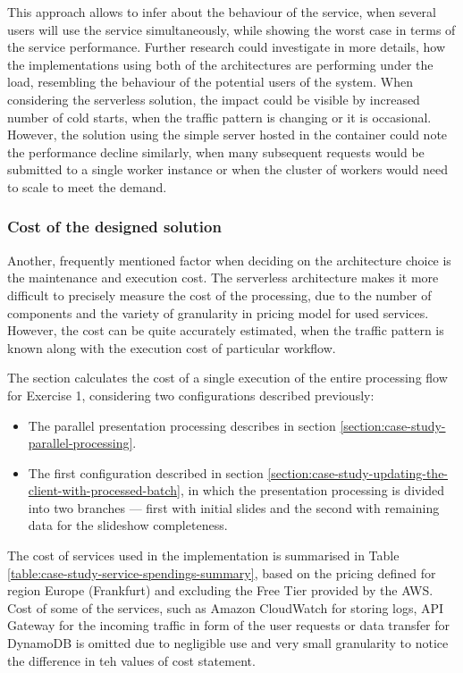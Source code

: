 \begin{itemize}
    This approach allows to infer about the behaviour of the service, when several users will use the service simultaneously, while showing the worst case in terms of the service performance.
    Further research could investigate in more details, how the implementations using both of the architectures are performing under the load, resembling the behaviour of the potential users of the system.
    When considering the serverless solution, the impact could be visible by increased number of cold starts, when the traffic pattern is changing or it is occasional. However, the solution using the simple server hosted in the container could note the performance decline similarly, when many subsequent requests would be submitted to a single worker instance or when the cluster of workers would need to scale to meet the demand.
\end{itemize}

\subsubsection{Cost of the designed solution}

Another, frequently mentioned factor when deciding on the architecture choice is the maintenance and execution cost. The serverless architecture makes it more difficult to precisely measure the cost of the processing, due to the number of components and the variety of granularity in pricing model for used services. However, the cost can be quite accurately estimated, when the traffic pattern is known along with the execution cost of particular workflow.

The section calculates the cost of a single execution of the entire processing flow for Exercise 1, considering two configurations described previously:

\begin{itemize}
   \item The parallel presentation processing describes in section \ref{section:case-study-parallel-processing}.
   \item The first configuration described in section \ref{section:case-study-updating-the-client-with-processed-batch}, in which the presentation processing is divided into two branches --- first with initial slides and the second with remaining data for the slideshow completeness.
\end{itemize}

The cost of services used in the implementation is summarised in Table \ref{table:case-study-service-spendings-summary}, based on the pricing defined for region Europe (Frankfurt) and excluding the Free Tier provided by the AWS.
Cost of some of the services, such as Amazon CloudWatch for storing logs, API Gateway for the incoming traffic in form of the user requests or data transfer for DynamoDB is omitted due to negligible use and very small granularity to notice the difference in teh values of cost statement.


